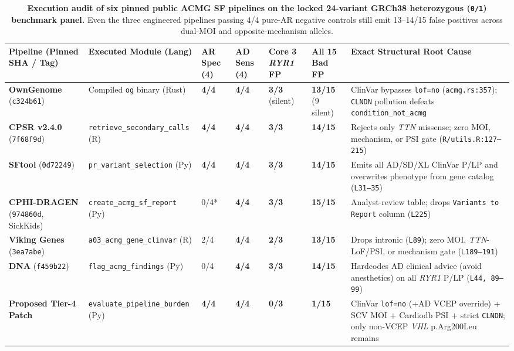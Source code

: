 \documentclass[11pt,letterpaper]{article}
\begin{document}
\begin{table}[!t]
\centering
\caption{\textbf{Execution audit of six pinned public ACMG SF pipelines on the locked 24-variant GRCh38 heterozygous (\texttt{0/1}) benchmark panel.} Even the three engineered pipelines passing 4/4 pure-AR negative controls still emit 13--14/15 false positives across dual-MOI and opposite-mechanism alleles.}
\label{tab:pipelines}
\footnotesize
\setlength{\tabcolsep}{3.0pt}
\begin{tabularx}{\textwidth}{L{2.45cm} L{2.35cm} C{0.88cm} C{0.88cm} C{1.12cm} C{1.18cm} Y}
\toprule
\textbf{Pipeline (Pinned SHA / Tag)} & \textbf{Executed Module (Lang)} & \textbf{AR Spec (4)} & \textbf{AD Sens (4)} & \textbf{Core 3 \textit{RYR1} FP} & \textbf{All 15 Bad FP} & \textbf{Exact Structural Root Cause} \\
\midrule
\textbf{OwnGenome} (\texttt{c324b61}) & Compiled \texttt{og} binary (Rust) & \textbf{4/4} & \textbf{4/4} & \textbf{3/3} (silent) & \textbf{13/15} (9 silent) & ClinVar bypasses \texttt{lof=no} (\texttt{acmg.rs:357}); \texttt{CLNDN} pollution defeats \texttt{condition\_\allowbreak not\_\allowbreak acmg} \\
\textbf{CPSR v2.4.0} (\texttt{7f68f9d}) & \texttt{retrieve\_\allowbreak secondary\_\allowbreak calls} (R) & \textbf{4/4} & \textbf{4/4} & \textbf{3/3} & \textbf{14/15} & Rejects only \textit{TTN} missense; zero MOI, mechanism, or PSI gate (\texttt{R/utils.R:127--215}) \\
\textbf{SFtool} (\texttt{0d72249}) & \texttt{pr\_\allowbreak variant\_\allowbreak selection} (Py) & \textbf{4/4} & \textbf{4/4} & \textbf{3/3} & \textbf{14/15} & Emits all AD/SD/XL ClinVar P/LP and overwrites phenotype from gene catalog (\texttt{L31--35}) \\
\textbf{CPHI-DRAGEN} (\texttt{974860d}, SickKids) & \texttt{create\_\allowbreak acmg\_\allowbreak sf\_\allowbreak report} (Py) & 0/4* & \textbf{4/4} & \textbf{3/3} & \textbf{15/15} & Analyst-review table; drops \texttt{Variants to Report} column (\texttt{L225}) \\
\textbf{Viking Genes} (\texttt{3ea7abe}) & \texttt{a03\_\allowbreak acmg\_\allowbreak gene\_\allowbreak clinvar} (R) & 2/4 & \textbf{4/4} & \textbf{2/3} & \textbf{13/15} & Drops intronic (\texttt{L89}); zero MOI, \textit{TTN}-LoF/PSI, or mechanism gate (\texttt{L189--191}) \\
\textbf{DNA} (\texttt{f459b22}) & \texttt{flag\_\allowbreak acmg\_\allowbreak findings} (Py) & 0/4 & \textbf{4/4} & \textbf{3/3} & \textbf{14/15} & Hardcodes AD clinical advice (avoid anesthetics) on all \textit{RYR1} P/LP (\texttt{L44, 89--99}) \\
\midrule
\textbf{Proposed Tier-4 Patch} & \texttt{evaluate\_\allowbreak pipeline\_\allowbreak burden} (Py) & \textbf{4/4} & \textbf{4/4} & \textbf{0/3} & \textbf{1/15} & ClinVar \texttt{lof=no} (+AD VCEP override) + SCV MOI + Cardiodb PSI + strict \texttt{CLNDN}; only non-VCEP \textit{VHL} p.Arg200Leu remains \\
\bottomrule
\end{tabularx}
\vspace{2pt}


\end{table}
\end{document}

